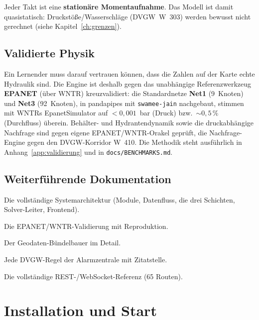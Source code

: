 \documentclass[11pt,a4paper,parskip=half]{scrreprt}
\newcommand{\api}[1]{\texttt{#1}}               %
\newcommand{\file}[1]{\texttt{#1}}              %
\begin{document}
Jeder Takt ist eine \textbf{stationäre Momentaufnahme}. Das Modell ist damit
quasistatisch: Druckstöße/Wasserschläge (DVGW~W~303) werden bewusst nicht
gerechnet (siehe Kapitel~\ref{ch:grenzen}).

\section{Validierte Physik}
\label{sec:validierung-intro}

Ein Lernender muss darauf vertrauen können, dass die Zahlen auf der Karte echte
Hydraulik sind. Die Engine ist deshalb gegen das unabhängige Referenzwerkzeug
\textbf{EPANET} (über WNTR) kreuzvalidiert: die Standardnetze \textbf{Net1}
(9~Knoten) und \textbf{Net3} (92~Knoten), in pandapipes mit \api{swamee-jain}
nachgebaut, stimmen mit WNTRs EpanetSimulator auf $<0{,}001$~bar (Druck) bzw.\
$\sim0{,}5\,\%$ (Durchfluss) überein. Behälter- und Hydrantendynamik sowie die
druckabhängige Nachfrage sind gegen eigene EPANET/WNTR-Orakel geprüft, die
Nachfrage-Engine gegen den DVGW-Korridor W~410. Die Methodik steht ausführlich in
Anhang~\ref{app:validierung} und in \file{docs/BENCHMARKS.md}.

\section{Weiterführende Dokumentation}

\begin{description}[leftmargin=1.2em]
\item[\file{docs/ARCHITECTURE.md}] Die vollständige Systemarchitektur (Module,
  Datenfluss, die drei Schichten, Solver-Leiter, Frontend).
\item[\file{docs/BENCHMARKS.md}] Die EPANET/WNTR-Validierung mit Reproduktion.
\item[\file{docs/GEODATA\_BUILDER.md}] Der Geodaten-Bündelbauer im Detail.
\item[\file{docs/COMPLIANCE.md}] Jede DVGW-Regel der Alarmzentrale mit Zitatstelle.
\item[\file{docs/API.md}] Die vollständige REST-/WebSocket-Referenz (65 Routen).
\end{description}

\chapter{Installation und Start}
\label{ch:installation}
\end{document}
